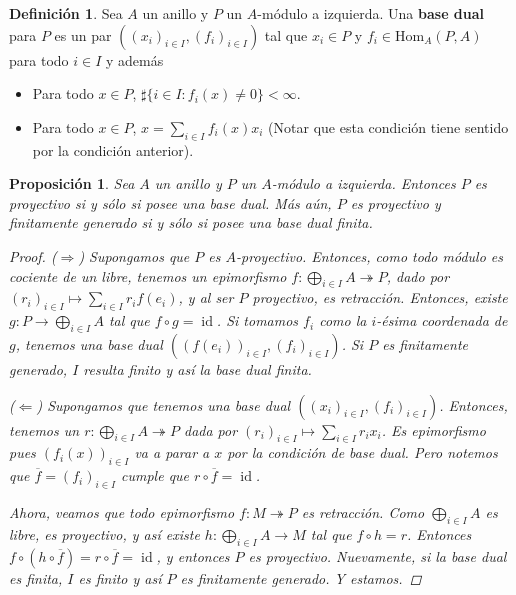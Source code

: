 \documentclass[12pt]{book}
\newtheorem{prop}[teo]{Proposición}
\theoremstyle{definition}
\newtheorem{defn}[teo]{Definición}
\renewcommand{\hom}{\mathrm{Hom}}
\DeclareMathOperator{\id}{id}
\begin{document}
\begin{defn}
Sea $A$ un anillo y $P$ un $A$-módulo a izquierda. Una \textbf{base dual} para $P$ es un par $((x_i)_{i\in I},(f_i)_{i\in I})$ tal que $x_i\in P$ y $f_i\in \hom_A(P,A)$ para todo $i\in I$ y además \begin{itemize}\item Para todo $x\in P$, $\sharp\{i\in I : f_i(x)\neq 0\}<\infty$. \item Para todo $x\in P$, $x=\displaystyle\sum_{i\in I}f_i(x)x_i$ (Notar que esta condición tiene sentido por la condición anterior). \end{itemize}
\end{defn}

\begin{prop}
Sea $A$ un anillo y $P$ un $A$-módulo a izquierda. Entonces $P$ es proyectivo si y sólo si posee una base dual. Más aún, $P$ es proyectivo y finitamente generado si y sólo si posee una base dual finita.
\begin{proof}
($\Longrightarrow$) Supongamos que $P$ es $A$-proyectivo. Entonces, como todo módulo es cociente de un libre, tenemos un epimorfismo $f:\displaystyle\bigoplus_{i\in I}A \twoheadrightarrow P$, dado por $(r_i)_{i\in I}\mapsto\displaystyle\sum_{i\in I}r_if(e_i)$, y al ser $P$ proyectivo, es retracción. Entonces, existe $g:P\to \displaystyle\bigoplus_{i\in I}A$ tal que $f\circ g = \id$. Si tomamos $f_i$ como la $i$-ésima coordenada de $g$, tenemos una base dual $((f(e_i))_{i\in I}, (f_i)_{i\in I})$. Si $P$ es finitamente generado, $I$ resulta finito y así la base dual finita.

($\Longleftarrow$) Supongamos que tenemos una base dual $((x_i)_{i\in I},(f_i)_{i\in I})$. Entonces, tenemos un $r:\displaystyle\bigoplus_{i\in I}A\twoheadrightarrow P$ dada por $(r_i)_{i\in I}\mapsto \displaystyle\sum_{i\in I}r_ix_i$. Es epimorfismo pues $(f_i(x))_{i\in I}$ va a parar a $x$ por la condición de base dual. Pero notemos que $\overline{f}=(f_i)_{i\in I}$ cumple que $r\circ \overline{f}=\id$.

Ahora, veamos que todo epimorfismo $f:M\twoheadrightarrow P$ es retracción. Como $\displaystyle\bigoplus_{i\in I}A$ es libre, es proyectivo, y así existe $h:\displaystyle\bigoplus_{i\in I}A\to M$ tal que $f\circ h = r$. Entonces $f\circ (h\circ \overline{f}) = r\circ \overline{f} = \id$, y entonces $P$ es proyectivo. Nuevamente, si la base dual es finita, $I$ es finito y así $P$ es finitamente generado. Y estamos.
\end{proof}
\end{prop}
\end{document}
